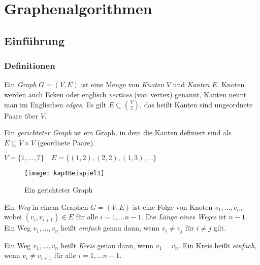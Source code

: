 \chapter{Graphenalgorithmen}
\section{Einführung}
\subsection{Definitionen}
\begin{Def}[Graph]
  \hspace{\parindent}Ein \textit{Graph} $G=(V, E)$ ist eine Menge von \textit{Knoten} $V$ und \textit{Kanten} $E$. Knoten werden auch Ecken oder englisch \textit{vertices} (von vertex) genannt, Kanten nennt man im Englischen \textit{edges}. Es gilt $E \subseteq \binom{V}{2}$, das heißt Kanten sind ungeordnete Paare über $V$.
\end{Def}

\begin{Def}
  \hspace{\parindent}Ein \textit{gerichteter Graph} ist ein Graph, in dem die Kanten definiert sind als $E \subseteq V \times V$ (geordnete Paare).
\end{Def}

\begin{Bsp}
  \hspace{\parindent}$V = \{1, \ldots, 7\} \quad E = \{(1,2), (2,2), (1,3), \ldots \}$
  
  \begin{figure}[htb]
    \centering
    \texttt{[image: kap4Beispiel1]}
    \caption{Ein gerichteter Graph}
    \label{kap4Beispiel1}
  \end{figure}
\end{Bsp}

\begin{Def}
  \hspace{\parindent}Ein \textit{Weg} in einem Graphen $G=(V,E)$ ist eine Folge von Knoten $v_1, \ldots, v_n$, wobei $(v_{i}, v_{i+1}) \in E$ für alle $i=1,\ldots n-1$. Die \textit{Länge eines Weges} ist $n-1$. Ein Weg $v_1, \ldots, v_n$ heißt \textit{einfach} genau dann, wenn $v_i \neq v_j$ für $i \neq j$ gilt.
\end{Def}

\begin{Def}
  \hspace{\parindent}Ein Weg $v_1, \ldots, v_n$ heißt \textit{Kreis} genau dann, wenn $v_1=v_n$. Ein Kreis heißt \textit{einfach}, wenn $v_i \neq v_{i+1}$ für alle $i=1, \ldots n-1$.
\end{Def}

